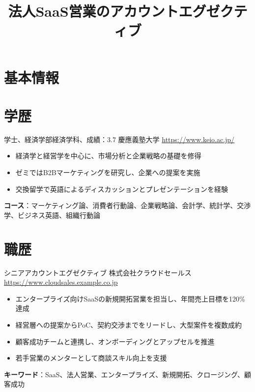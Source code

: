 \documentclass[a4paper, serif, 10pt]{moderncv}
\title{法人SaaS営業のアカウントエグゼクティブ}
\begin{document}
\maketitle

\section{基本情報}

\section{学歴}

        {学士、経済学部経済学科、成績：3.7}
        {慶應義塾大学}
        {\url{https://www.keio.ac.jp/}}
        {}
        {\begin{itemize}
\item 経済学と経営学を中心に、市場分析と企業戦略の基礎を修得
\item ゼミではB2Bマーケティングを研究し、企業への提案を実施
\item 交換留学で英語によるディスカッションとプレゼンテーションを経験
\end{itemize}
\textbf{コース}：マーケティング論、消費者行動論、企業戦略論、会計学、統計学、交渉学、ビジネス英語、組織行動論}
\section{職歴}

        {シニアアカウントエグゼクティブ}
        {株式会社クラウドセールス}
        {\url{https://www.cloudsales.example.co.jp}}
        {}
        {\begin{itemize}
\item エンタープライズ向けSaaSの新規開拓営業を担当し、年間売上目標を120\%達成
\item 経営層への提案からPoC、契約交渉までをリードし、大型案件を複数成約
\item 顧客成功チームと連携し、オンボーディングとアップセルを推進
\item 若手営業のメンターとして商談スキル向上を支援
\end{itemize}
\textbf{キーワード}：SaaS、法人営業、エンタープライズ、新規開拓、クロージング、顧客成功}
\end{document}
